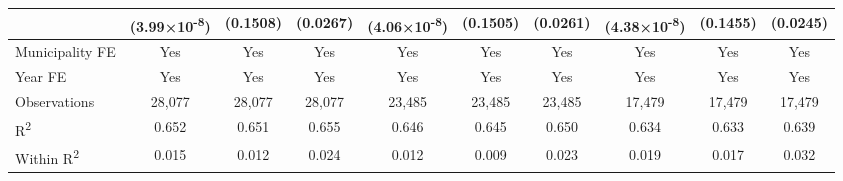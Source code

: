 \documentclass[12pt]{article}
\begin{document}
\begin{landscape}
\begin{table}[htbp]
\begin{adjustbox}{max width=\textwidth, max height=\textheight}
\begin{tabular}{l@{\hspace{.5cm}}ccccccccc}
                            & (3.99×10\textsuperscript{-8}) & (0.1508)        & (0.0267)       & (4.06×10\textsuperscript{-8}) & (0.1505)        & (0.0261)       & (4.38×10\textsuperscript{-8}) & (0.1455)        & (0.0245)       \\
\midrule
Municipality FE             & Yes             & Yes             & Yes            & Yes             & Yes             & Yes            & Yes             & Yes             & Yes            \\
Year FE                     & Yes             & Yes             & Yes            & Yes             & Yes             & Yes            & Yes             & Yes             & Yes            \\
Observations               & 28,077          & 28,077          & 28,077         & 23,485          & 23,485          & 23,485         & 17,479          & 17,479          & 17,479         \\
R\textsuperscript{2}       & 0.652           & 0.651           & 0.655          & 0.646           & 0.645           & 0.650          & 0.634           & 0.633           & 0.639          \\
Within R\textsuperscript{2}& 0.015           & 0.012           & 0.024          & 0.012           & 0.009           & 0.023          & 0.019           & 0.017           & 0.032          \\
\bottomrule
\end{tabular}
\end{adjustbox}
\end{table}
\end{landscape}
\end{document}
